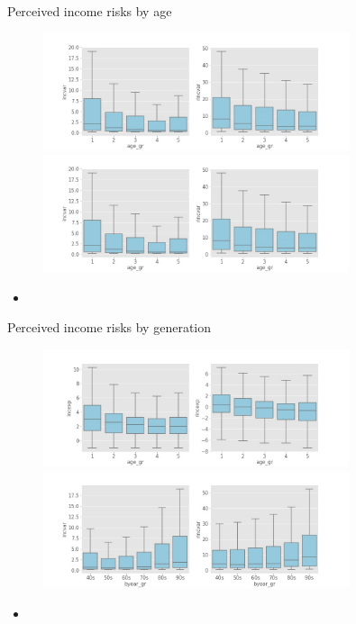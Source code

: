 \documentclass{beamer}
\begin{document}
\begin{frame}{Perceived income risks by age}
	\begin{figure}
		\centering
		\label{boxplot_age_gr}
		\includegraphics[width=0.8\textwidth]{figures/boxplot_exp_age_gr} \\
		\includegraphics[width=0.8\textwidth]{figures/boxplot_var_age_gr}
	\end{figure}
	\begin{itemize}
		\item 
	\end{itemize}
\end{frame}



\begin{frame}{Perceived income risks by generation}
	\begin{figure}
		\centering
		\label{boxplot_byear_gr}
		\includegraphics[width=0.8\textwidth]{figures/boxplot_exp_byear_gr} \\
		\includegraphics[width=0.8\textwidth]{figures/boxplot_var_byear_gr}
	\end{figure}
	\begin{itemize}
		\item 
	\end{itemize}
\end{frame}
\end{document}
